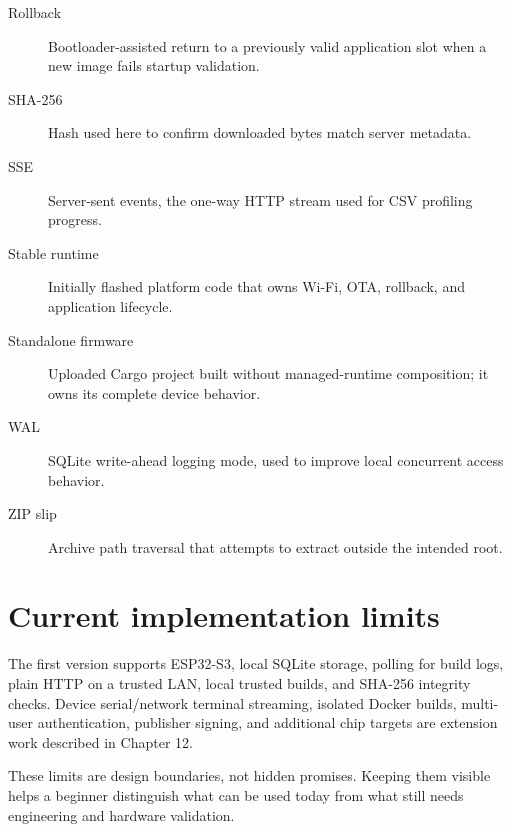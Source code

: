 \begin{description}
  \item[Rollback] Bootloader-assisted return to a previously valid application slot when a new image fails startup validation.
  \item[SHA-256] Hash used here to confirm downloaded bytes match server metadata.
  \item[SSE] Server-sent events, the one-way HTTP stream used for CSV profiling progress.
  \item[Stable runtime] Initially flashed platform code that owns Wi-Fi, OTA, rollback, and application lifecycle.
  \item[Standalone firmware] Uploaded Cargo project built without managed-runtime composition; it owns its complete device behavior.
  \item[WAL] SQLite write-ahead logging mode, used to improve local concurrent access behavior.
  \item[ZIP slip] Archive path traversal that attempts to extract outside the intended root.
\end{description}

\section{Current implementation limits}

The first version supports ESP32-S3, local SQLite storage, polling for build logs, plain HTTP on a trusted LAN, local trusted builds, and SHA-256 integrity checks. Device serial/network terminal streaming, isolated Docker builds, multi-user authentication, publisher signing, and additional chip targets are extension work described in Chapter 12.

These limits are design boundaries, not hidden promises. Keeping them visible helps a beginner distinguish what can be used today from what still needs engineering and hardware validation.
